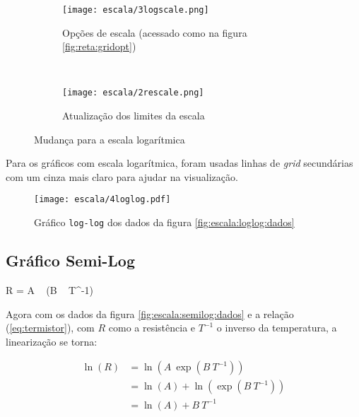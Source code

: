     \begin{figure}[htbp]
        \centering
        \begin{subfigure}{0.55\textwidth}
            \centering
            \texttt{[image: escala/3logscale.png]}

            \caption{Opções de escala (acessado como na figura \ref{fig:reta:gridopt})}
            \label{fig:escala:rescale}
        \end{subfigure}
        ~
        \begin{subfigure}{0.4\textwidth}
            \centering
            \texttt{[image: escala/2rescale.png]}

            \caption{Atualização dos limites da escala}
            \label{fig:escala:logscale}
        \end{subfigure}
        \caption{Mudança para a escala logarítmica}
        \label{fig:escala:tutorial}
    \end{figure}

    \begin{nota}
        Para os gráficos com escala logarítmica, foram usadas linhas de \textit{grid} secundárias com um cinza mais claro para ajudar na visualização.
    \end{nota}

    \begin{figure}[htbp]
        \centering
        \texttt{[image: escala/4loglog.pdf]}

        \caption{Gráfico \texttt{log-log} dos dados da figura \ref{fig:escala:loglog:dados}}
        \label{fig:escala:loglog:resultado}
    \end{figure}


\subsection{Gráfico Semi-Log}

    \begin{equacao} \label{eq:termistor}
        R = A ~ \exp\left(B ~ T^{-1}\right)
    \end{equacao}

    Agora com os dados da figura \ref{fig:escala:semilog:dados} e a relação (\ref{eq:termistor}), com $R$ como a resistência e $T^{-1}$ o inverso da temperatura, a linearização se torna:

    \begin{align*}
        \ln(R)
            &= \ln\left(A ~ \exp\left(B ~ T^{-1}\right) \right) \\
            &= \ln(A) + \ln\left(\exp\left(B ~ T^{-1}\right) \right) \\
            &= \ln(A) + B ~ T^{-1}
    \end{align*}


